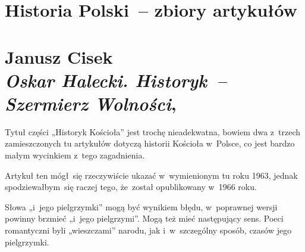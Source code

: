 \documentclass[a4paper,11pt]{article}
\numberwithin{equation}{section}
\begin{document}
\section{Historia Polski~-- zbiory artykułów}

\VerSpaceTwo



\section{Janusz Cisek \\
  \textit{Oskar Halecki. Historyk~-- Szermierz Wolności},
  \cite{CisekOskarHalecki2009} }




 Tytuł części „Historyk Kościoła” jest trochę
nieadekwatna, bowiem dwa z~trzech zamieszczonych tu artykułów dotyczą
historii Kościoła w~Polsce, co jest bardzo małym wycinkiem z~tego
zagadnienia.

\VerSpaceFour





 Artykuł ten mógł~się rzeczywiście ukazać
w~wymienionym tu roku 1963, jednak spodziewałbym~się raczej tego,
że~został opublikowany w~1966 roku.

\VerSpaceFour



 Słowa „i~jego pielgrzymki” mogą być wynikiem
błędu, w~poprawnej wersji powinny brzmieć „i~jego pielgrzymi”. Mogą
też mieć następujący sens. Poeci romantyczni byli „wieszczami”
narodu, jak i~w~szczególny sposób, czasów jego pielgrzymki.





\end{document}

